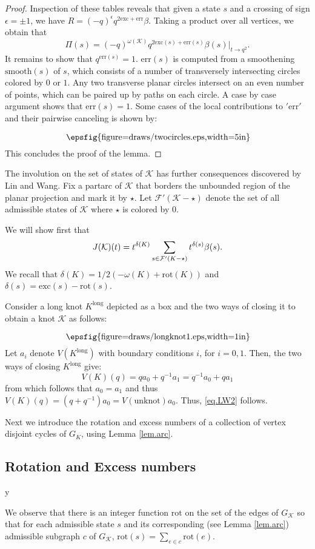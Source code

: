 \documentclass{amsart}
\theoremstyle{plain}
\theoremstyle{definition}
\theoremstyle{remark}
\def\printname#1{
        \if\draft y
                \smash{\makebox[0pt]{\hspace{-0.5in}
                        \raisebox{8pt}{\tt\tiny #1}}}
        \fi
}
\newcommand{\psdraw}[2]
         {\begin{array}{c} \hspace{-1.3mm}
        \raisebox{-4pt}{\epsfig{figure=draws/#1.eps,width=#2}}
        \hspace{-1.9mm}\end{array}}
\def\lbl#1{\label{#1}\printname{#1}}
\def\K{\mathcal K}
\def\F{\mathcal F}
\def\w{\omega}
\def\e{\epsilon}
\def\d{\delta}
\def\b{\beta}
\def\rot{\mathrm{rot}}
\def\exc{\mathrm{exc}}
\def\smooth{\mathrm{smooth}}
\def\err{\mathrm{err}}
\begin{document}
\begin{proof}
Inspection of these tables reveals that given a state $s$ and a crossing
of sign $\e=\pm 1$, we have $R=(-q)^{\e} q^{2 \exc+\err} \b$. Taking a product
over all vertices, we obtain that
$$
\Pi(s)=(-q)^{\w(\K)} q^{2 \exc(s)+\err(s)} \b(s)|_{t \to q^2}.
$$
It remains to show that $q^{\err(s)}=1$. $\err(s)$ is computed from a 
smoothening $\smooth(s)$ of $s$, which consists of a number of transversely
intersecting circles colored by $0$ or $1$. Any two transverse planar circles 
intersect on an even number of points, which can be paired up by paths 
on each circle. A case by case argument shows that
$\err(s)=1$. Some cases of the local contributions to $'\err'$ 
and their pairwise canceling is shown by:
$$
\psdraw{twocircles}{5in}
$$
This concludes the proof of the lemma.
\end{proof}

The involution on the set of states of $\K$ has further consequences
discovered by Lin and Wang. Fix a partarc of $\K$ that borders the unbounded
region of the planar projection and mark it by $\star$. 
Let $\F'(\K-\star)$ denote the set of all admissible states
of $\K$ where $\star$ is colored by $0$.  

We will show first that
\begin{equation}
\lbl{eq.LW2}
J(\K)(t)= t^{\d(K)} \sum_{s \in \F'(K-\star)}  
t^{\d(s)} \b(s).
\end{equation}
We recall that
$ \d(K)=1/2(-\w(K)+\rot(K))$ and $\d(s)=\exc(s)-\rot(s)$.

Consider a long knot $K^{\text{long}}$ depicted as a box
and the two ways of closing it to obtain a knot $\K$ as follows:
$$
\psdraw{longknot1}{1in}
$$
Let $a_i$ denote $V(K^{\text{long}})$ with boundary conditions $i$,
for $i=0,1$. Then, the two ways of closing $K^{\text{long}}$ give:
$$
V(K)(q)=q a_0 + q^{-1} a_1 = q^{-1} a_0 + q a_1
$$
from which follows that $a_0=a_1$ and thus $V(K)(q)=(q+q^{-1}) a_0=
V(\text{unknot}) a_0$. Thus, \eqref{eq.LW2} follows.

Next we introduce the rotation and excess numbers of a collection of
vertex disjoint cycles of $G_K$, using Lemma \ref{lem.arc}.



\subsection{Rotation and Excess numbers}
\lbl{sub.excess}

We observe that there is an integer function $\rot$  on the set of the edges
of $G_{\K}$ so that for each admissible state $s$ and its corresponding 
(see Lemma \ref{lem.arc})
 admissible subgraph $c$ of $G_{\K}$, $\rot(s)= \sum_{e\in c}\rot(e)$.
\end{document}
